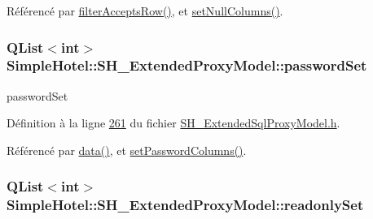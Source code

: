 Référencé par \hyperlink{classSimpleHotel_1_1SH__ExtendedProxyModel_a11b30f0f630fe9ddaa778eb9534918e1}{filter\-Accepts\-Row()}, et \hyperlink{classSimpleHotel_1_1SH__ExtendedProxyModel_adf6a9faa540bda5bb7bbe9040fafc667}{set\-Null\-Columns()}.

\hypertarget{classSimpleHotel_1_1SH__ExtendedProxyModel_af630ba54d80971ce64dbbf875f94a073}{
\subsubsection[{password\-Set}]{\setlength{\rightskip}{0pt plus 5cm}Q\-List$<$int$>$ Simple\-Hotel\-::\-S\-H\-\_\-\-Extended\-Proxy\-Model\-::password\-Set\hspace{0.3cm}{\ttfamily [private]}}}\label{classSimpleHotel_1_1SH__ExtendedProxyModel_af630ba54d80971ce64dbbf875f94a073}


password\-Set 



Définition à la ligne \hyperlink{SH__ExtendedSqlProxyModel_8h_source_l00261}{261} du fichier \hyperlink{SH__ExtendedSqlProxyModel_8h_source}{S\-H\-\_\-\-Extended\-Sql\-Proxy\-Model.\-h}.



Référencé par \hyperlink{classSimpleHotel_1_1SH__ExtendedProxyModel_a25bc1047c6e9835d9d3c580e0a4ec42a}{data()}, et \hyperlink{classSimpleHotel_1_1SH__ExtendedProxyModel_a4a3cc4b9dfceb14bfd71770a7189f686}{set\-Password\-Columns()}.

\hypertarget{classSimpleHotel_1_1SH__ExtendedProxyModel_a5b7b000fd9eaf85564589f0023dc93b0}{
\subsubsection[{readonly\-Set}]{\setlength{\rightskip}{0pt plus 5cm}Q\-List$<$int$>$ Simple\-Hotel\-::\-S\-H\-\_\-\-Extended\-Proxy\-Model\-::readonly\-Set\hspace{0.3cm}{\ttfamily [private]}}}\label{classSimpleHotel_1_1SH__ExtendedProxyModel_a5b7b000fd9eaf85564589f0023dc93b0}


